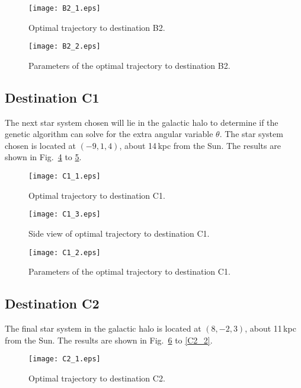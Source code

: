 \documentclass[review]{elsarticle}
\begin{document}
\begin{figure}[h!]
\centering
\texttt{[image: B2\_1.eps]}
\caption{Optimal trajectory to destination B2.}
\label{B2_1}
\end{figure}

\begin{figure}[h!]
\centering
\texttt{[image: B2\_2.eps]}
\caption{Parameters of the optimal trajectory to destination B2.}
\label{B2_2}
\end{figure}

\subsection{Destination C1}
The next star system chosen will lie in the galactic halo to determine if the genetic algorithm can solve for the extra angular variable $\theta$. The star system chosen is located at $(-9,1,4)$, about 14\,kpc from the Sun. The results are shown in Fig.~\ref{C1_1} to \ref{C1_2}.

\begin{figure}[h!]
\centering
\texttt{[image: C1\_1.eps]}
\caption{Optimal trajectory to destination C1.}
\label{C1_1}
\end{figure}

\begin{figure}[h!]
\centering
\texttt{[image: C1\_3.eps]}
\caption{Side view of optimal trajectory to destination C1.}
\label{C1_1}
\end{figure}

\begin{figure}[h!]
\centering
\texttt{[image: C1\_2.eps]}
\caption{Parameters of the optimal trajectory to destination C1.}
\label{C1_2}
\end{figure}

\subsection{Destination C2}
The final star system in the galactic halo is located at $(8,-2,3)$, about 11\,kpc from the Sun. The results are shown in Fig.~\ref{C2_1} to \ref{C2_2}. 

\begin{figure}[h!]
\centering
\texttt{[image: C2\_1.eps]}
\caption{Optimal trajectory to destination C2.}
\label{C2_1}
\end{figure}
\end{document}
